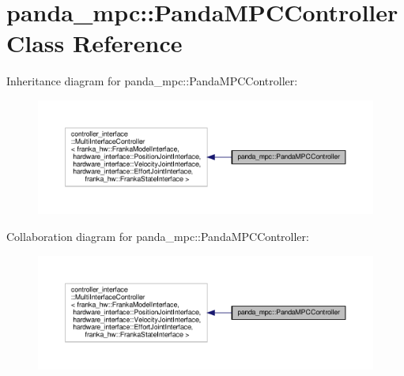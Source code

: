 \hypertarget{classpanda__mpc_1_1_panda_m_p_c_controller}{}\section{panda\+\_\+mpc\+:\+:Panda\+M\+P\+C\+Controller Class Reference}
\label{classpanda__mpc_1_1_panda_m_p_c_controller}


Inheritance diagram for panda\+\_\+mpc\+:\+:Panda\+M\+P\+C\+Controller\+:
\nopagebreak
\begin{figure}[H]
\begin{center}
\leavevmode
\includegraphics[width=350pt]{classpanda__mpc_1_1_panda_m_p_c_controller__inherit__graph}
\end{center}
\end{figure}


Collaboration diagram for panda\+\_\+mpc\+:\+:Panda\+M\+P\+C\+Controller\+:
\nopagebreak
\begin{figure}[H]
\begin{center}
\leavevmode
\includegraphics[width=350pt]{classpanda__mpc_1_1_panda_m_p_c_controller__coll__graph}
\end{center}
\end{figure}
